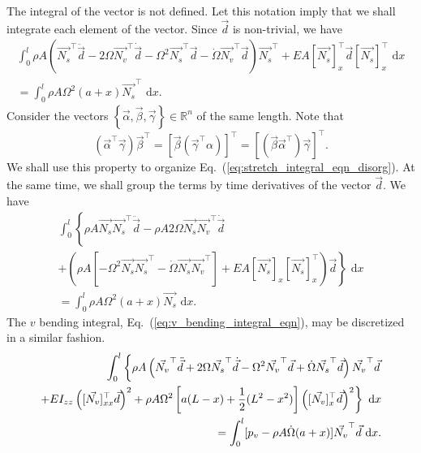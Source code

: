The integral of the vector is not defined. Let this notation imply that we shall integrate each element of the vector. Since $\vec d$ is non-trivial, we have
\begin{eqnarray}
\label{eq:stretch_integral_eqn_disorg}
\int_0^l \rho A\left(\vec{N_s}^\top\ddot{\vec d}-2\Omega\vec{N_v}^\top\dot{\vec{d}}-\Omega^2\vec{N_s}^\top\vec{d}-\dot\Omega \vec{N_v}^\top\vec{d}\right)\vec{N_s}^\top+EA[\vec{N_s}]_x^\top\vec{d}[\vec{N_s}]_x^\top\text{ d}x \\
= \int_0^l \rho A\Omega^2(a+x)\vec{N_s}^\top\text{ d}x. \nonumber
\end{eqnarray}
Consider the vectors $\left\lbrace\vec{\alpha},\vec{\beta},\vec{\gamma}\right\rbrace\in\mathbb{R}^n$ of the same length. Note that
\begin{equation}
\left(\vec\alpha^\top\vec\gamma\right)\vec\beta^\top = \left[\vec\beta\left(\vec\gamma^\top\alpha\right)\right]^\top =  \left[\left(\vec\beta\vec\alpha^\top\right)\vec\gamma\right]^\top.
\label{eq:vec_prod_transpose}
\end{equation}
We shall use this property to organize Eq.~(\ref{eq:stretch_integral_eqn_disorg}). At the same time, we shall group the terms by time derivatives of the vector $\vec d$. We have
\begin{eqnarray}
\label{eq:s.disc.final}
\int_0^l \left\lbrace\rho A\vec{N_s}\vec{N_s}^\top\ddot{\vec d}-\rho A2\Omega\vec{N_s}\vec{N_v}^\top\dot{\vec{d}}\right. \nonumber \\
\left.+\left(\rho A\left[-\Omega^2\vec{N_s}\vec{N_s}^\top-\dot\Omega \vec{N_s}\vec{N_v}^\top\right]+EA[\vec{N_s}]_x[\vec{N_s}]_x^\top\right)\vec{d}\right\rbrace\text{ d}x \\
 = \int_0^l \rho A\Omega^2(a+x)\vec{N_s}\text{ d}x. \nonumber
\end{eqnarray}
The $v$ bending integral, Eq.~(\ref{eq:v_bending_integral_eqn}), may be discretized in a similar fashion.
\begin{eqnarray}
\int_0^l\left\lbrace\rho A\left(\vec{N_v}^\top\ddot{\vec d} + 2\Omega\vec{N_s}^\top\dot{\vec d}-\Omega^2\vec{N_v}^\top\vec{d}+\dot\Omega \vec{N_s}^\top\vec{d}\right)\vec{N_v}^\top\vec{d}\vphantom{\left([\vec{N_v}]_{x}^\top\vec{d}\right)^2}\right.\nonumber \\
\left.+EI_{zz}\left([\vec{N_v}]_{xx}^\top\vec{d}\right)^2+\rho A\Omega^2\left[a(L-x)+\frac{1}{2}(L^2-x^2)\right]\left([\vec{N_v}]_{x}^\top\vec{d}\right)^2\right\rbrace\text{ d}x \\
= \int_0^l[p_v - \rho A\dot\Omega(a+x)]\vec{N_v}^\top\vec{d}\text{ d}x. \nonumber
\end{eqnarray}
